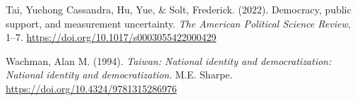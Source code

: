 \documentclass[
  12pt,
  12pt,
  letterpaper]{article}
\newlength{\cslhangindent}
\newenvironment{CSLReferences}[2] %
 {\begin{list}{}{%
  \setlength{\itemindent}{0pt}
  \setlength{\leftmargin}{0pt}
  \setlength{\parsep}{0pt}
  \ifodd #1
   \setlength{\leftmargin}{\cslhangindent}
   \setlength{\itemindent}{-1\cslhangindent}
  \fi
  \setlength{\itemsep}{#2\baselineskip}}}
 {\end{list}}
\begin{document}
\begin{CSLReferences}{1}{0}
Tai, Yuehong Cassandra, Hu, Yue, \& Solt, Frederick. (2022). {Democracy,
public support, and measurement uncertainty}. \emph{The American
Political Science Review}, 1--7.
\url{https://doi.org/10.1017/s0003055422000429}

Wachman, Alan M. (1994). \emph{{Taiwan: National identity and
democratization: National identity and democratization}}. M.E. Sharpe.
\url{https://doi.org/10.4324/9781315286976}

\end{CSLReferences}
\end{document}
